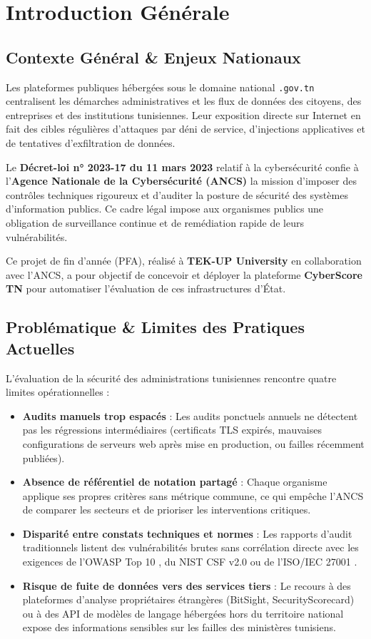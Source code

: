 \chapter{Introduction Générale}
\label{chap:intro}

\section{Contexte Général \& Enjeux Nationaux}
Les plateformes publiques hébergées sous le domaine national \texttt{.gov.tn} centralisent les démarches administratives et les flux de données des citoyens, des entreprises et des institutions tunisiennes. Leur exposition directe sur Internet en fait des cibles régulières d'attaques par déni de service, d'injections applicatives et de tentatives d'exfiltration de données.

Le \textbf{Décret-loi n° 2023-17 du 11 mars 2023} relatif à la cybersécurité \cite{decret2023} confie à l'\textbf{Agence Nationale de la Cybersécurité (ANCS)} la mission d'imposer des contrôles techniques rigoureux et d'auditer la posture de sécurité des systèmes d'information publics. Ce cadre légal impose aux organismes publics une obligation de surveillance continue et de remédiation rapide de leurs vulnérabilités.

Ce projet de fin d'année (PFA), réalisé à \textbf{TEK-UP University} en collaboration avec l'ANCS, a pour objectif de concevoir et déployer la plateforme \textbf{CyberScore TN} pour automatiser l'évaluation de ces infrastructures d'État.

\section{Problématique \& Limites des Pratiques Actuelles}
L'évaluation de la sécurité des administrations tunisiennes rencontre quatre limites opérationnelles :
\begin{itemize}
    \item \textbf{Audits manuels trop espacés} : Les audits ponctuels annuels ne détectent pas les régressions intermédiaires (certificats TLS expirés, mauvaises configurations de serveurs web après mise en production, ou failles récemment publiées).
    \item \textbf{Absence de référentiel de notation partagé} : Chaque organisme applique ses propres critères sans métrique commune, ce qui empêche l'ANCS de comparer les secteurs et de prioriser les interventions critiques.
    \item \textbf{Disparité entre constats techniques et normes} : Les rapports d'audit traditionnels listent des vulnérabilités brutes sans corrélation directe avec les exigences de l'OWASP Top 10 \cite{owasp2021}, du NIST CSF v2.0 \cite{nistcsfv2} ou de l'ISO/IEC 27001 \cite{iso27001}.
    \item \textbf{Risque de fuite de données vers des services tiers} : Le recours à des plateformes d'analyse propriétaires étrangères (BitSight, SecurityScorecard) ou à des API de modèles de langage hébergées hors du territoire national expose des informations sensibles sur les failles des ministères tunisiens.
\end{itemize}


